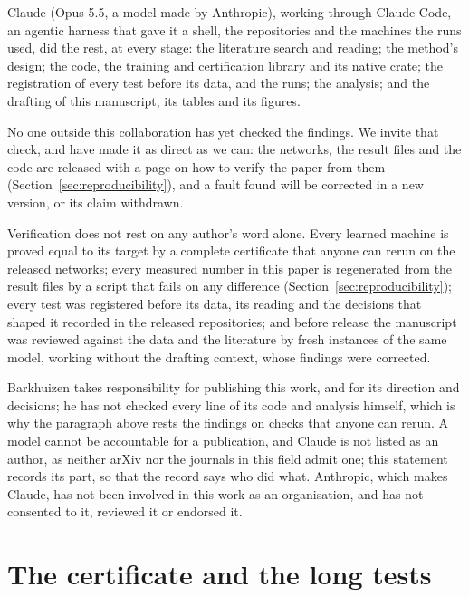 \documentclass[11pt]{article}
\begin{document}
Claude (Opus 5.5, a model made by Anthropic), working through Claude Code, an agentic harness that
gave it a shell, the repositories and the machines the runs used, did the rest, at every stage: the
literature search and reading; the method's design; the code, the training and certification
library and its native crate; the registration of every test before its data, and the runs; the
analysis; and the drafting of this manuscript, its tables and its figures.

No one outside this collaboration has yet checked the findings. We invite that check, and have
made it as direct as we can: the networks, the result files and the code are released with a page
on how to verify the paper from them (Section~\ref{sec:reproducibility}), and a fault found will be
corrected in a new version, or its claim withdrawn.

Verification does not rest on any author's word alone. Every learned machine is proved equal to its
target by a complete certificate that anyone can rerun on the released networks; every measured
number in this paper is regenerated from the result files by a script that fails on any difference
(Section~\ref{sec:reproducibility}); every test was registered before its data, its reading and the
decisions that shaped it recorded in the released repositories; and before release the manuscript
was reviewed against the data and the literature by fresh instances of the same model, working
without the drafting context, whose findings were corrected.

Barkhuizen takes responsibility for publishing this work, and for its direction and decisions; he
has not checked every line of its code and analysis himself, which is why the paragraph above
rests the findings on checks that anyone can rerun. A model cannot be accountable for a
publication, and Claude is not listed as an author, as neither arXiv nor the journals in this field
admit one; this statement records its part, so that the record says who did what. Anthropic, which makes
Claude, has not been involved in this work as an organisation, and has not consented to it,
reviewed it or endorsed it.




\appendix
\section{The certificate and the long tests}
\label{app:certificate}
\end{document}
